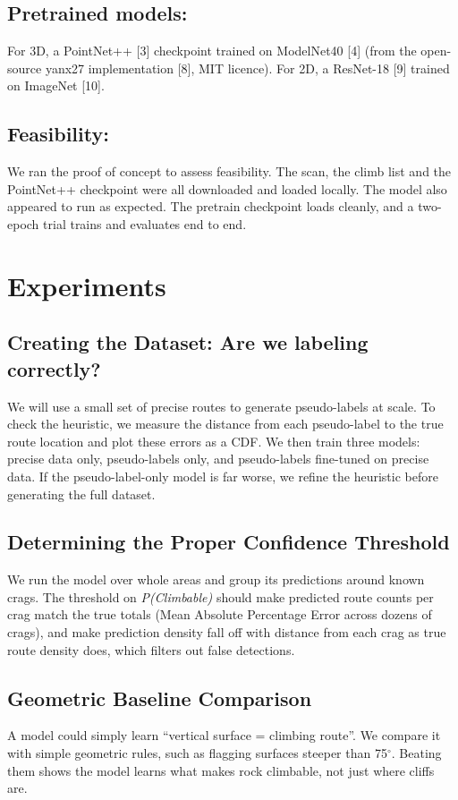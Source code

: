 \documentclass{mva2011}
\begin{document}
\subsection{Pretrained models:}
    For 3D, a PointNet++ [3] checkpoint trained on ModelNet40 [4] (from the open-source yanx27 implementation [8], MIT licence). For 2D, a ResNet-18 [9] trained on ImageNet [10].

\subsection{Feasibility:} 
    We ran the proof of concept to assess feasibility. The scan, the climb list and the PointNet++ checkpoint were all downloaded and loaded locally. The model also appeared to run as expected. The pretrain checkpoint loads cleanly, and a two-epoch trial trains and evaluates end to end.

\section{Experiments}

\subsection{Creating the Dataset: Are we labeling correctly?}
We will use a small set of precise routes to generate pseudo-labels at scale. To check the heuristic, we measure the distance from each pseudo-label to the true route location and plot these errors as a CDF. We then train three models: precise data only, pseudo-labels only, and pseudo-labels fine-tuned on precise data. If the pseudo-label-only model is far worse, we refine the heuristic before generating the full dataset.

\subsection{Determining the Proper Confidence Threshold}
We run the model over whole areas and group its predictions around known crags. The threshold on \emph{P(Climbable)} should make predicted route counts per crag match the true totals (Mean Absolute Percentage Error across dozens of crags), and make prediction density fall off with distance from each crag as true route density does, which filters out false detections.

\subsection{Geometric Baseline Comparison}
A model could simply learn ``vertical surface = climbing route''. We compare it with simple geometric rules, such as flagging surfaces steeper than 75$^\circ$. Beating them shows the model learns what makes rock climbable, not just where cliffs are.
\end{document}
